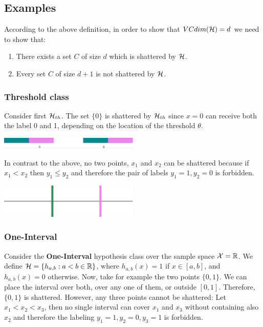 \subsection*{Examples}
According to the above definition, in order to show that $VCdim(\mathcal{H}) = d$ we need to show that:
\begin{enumerate}
\item There exists a set $C$ of size $d$ which is shattered by $\mathcal{H}$.
\item Every set $C$ of size $d+1$ is not shattered by $\mathcal{H}$.
\end{enumerate}

\subsubsection*{Threshold class}
Consider first $\mathcal{H}_{th}$. The set $\{0\}$ is shattered by  $\mathcal{H}_{th}$ since $x=0$ can receive both the label 0 and 1, depending on the location of the threshold $\theta$. 

\begin{center}
 \includegraphics[width=0.5\textwidth,height=0.05\textheight]{ThresholdVC1.png}
\end{center}

In contrast to the above, no two points, $x_1$ and $x_2$ can be shattered because if $x_1 < x_2$ then $y_1 \leq y_2$ and therefore the pair of labels $y_1=1, y_2=0$ is forbidden.

\begin{center}
 \includegraphics[width=0.5\textwidth,height=0.05\textheight]{ThresholdVC2.png}
\end{center}

\subsubsection*{One-Interval}
Consider the \textbf{One-Interval} hypothesis class over the sample space 
$\mathcal{X} = \mathbb{R}$. We define $\mathcal{H} = \{ h_{a,b} : a < b \in \mathbb{R}\}$, where $h_{a,b}(x)=1$ if $x \in [a,b]$, and $h_{a,b}(x)=0$ otherwise.
Now, take for example the two points $\{0,1\}$.  We can place the interval over both, over any one of them, or outside $[0, 1]$. Therefore, $\{0,1\}$ is shattered. However, any three points cannot be shattered:
Let $x_1 < x_2 < x_3$, then no single interval can cover $x_1$ and $x_3$ without containing also $x_2$ and therefore the labeling $y_1=1, y_2=0, y_3=1$ is forbidden.

